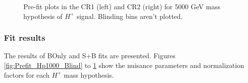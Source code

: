\begin{figure}[H]
  \centering
  \caption{Pre-fit plots in the CR1 (left) and CR2 (right) for 5000 GeV mass hypothesis of $H^{+}$ signal. Blinding bins aren't plotted.}
  \label{fig:Prefit_Hp5000_Blind}
\end{figure}

\subsubsection{Fit results}
\label{subsubsec:DataFitResults}
The results of BOnly and S+B fits are presented. Figures \ref{fig:Prefit_Hp1000_Blind} to \ref{fig:Prefit_Hp5000_Blind} show the nuisance parameters and normalization factors for each $H^{+}$ mass hypothesis. 

